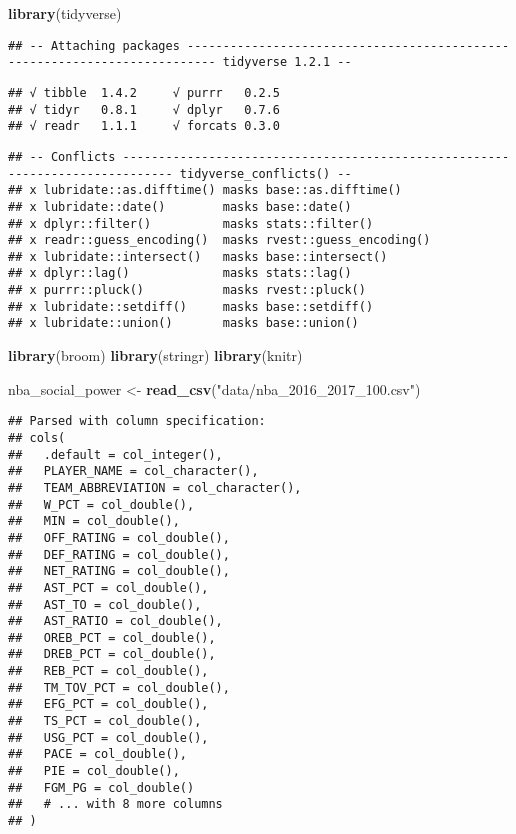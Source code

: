 \documentclass[]{article}
\title{}
\subtitle{Project Proposal}
\author{Pipe It Up!: Nagaprasad Rudrapatna, Karen Deng, Jack Muraika, Anna
Zolotor}
\date{2020-03-01}
\newenvironment{Shaded}{\begin{snugshade}}{\end{snugshade}}
\newcommand{\KeywordTok}[1]{\textcolor[rgb]{0.13,0.29,0.53}{\textbf{#1}}}
\newcommand{\NormalTok}[1]{#1}
\newcommand{\StringTok}[1]{\textcolor[rgb]{0.31,0.60,0.02}{#1}}
\begin{document}
\begin{Shaded}
\begin{Highlighting}[]
\KeywordTok{library}\NormalTok{(tidyverse)}
\end{Highlighting}
\end{Shaded}

\begin{verbatim}
## -- Attaching packages -------------------------------------------------------------------------- tidyverse 1.2.1 --
\end{verbatim}

\begin{verbatim}
## √ tibble  1.4.2     √ purrr   0.2.5
## √ tidyr   0.8.1     √ dplyr   0.7.6
## √ readr   1.1.1     √ forcats 0.3.0
\end{verbatim}

\begin{verbatim}
## -- Conflicts ----------------------------------------------------------------------------- tidyverse_conflicts() --
## x lubridate::as.difftime() masks base::as.difftime()
## x lubridate::date()        masks base::date()
## x dplyr::filter()          masks stats::filter()
## x readr::guess_encoding()  masks rvest::guess_encoding()
## x lubridate::intersect()   masks base::intersect()
## x dplyr::lag()             masks stats::lag()
## x purrr::pluck()           masks rvest::pluck()
## x lubridate::setdiff()     masks base::setdiff()
## x lubridate::union()       masks base::union()
\end{verbatim}

\begin{Shaded}
\begin{Highlighting}[]
\KeywordTok{library}\NormalTok{(broom)}
\KeywordTok{library}\NormalTok{(stringr)}
\KeywordTok{library}\NormalTok{(knitr)}
\end{Highlighting}
\end{Shaded}

\begin{Shaded}
\begin{Highlighting}[]
\NormalTok{nba_social_power <-}\StringTok{ }\KeywordTok{read_csv}\NormalTok{(}\StringTok{"data/nba_2016_2017_100.csv"}\NormalTok{)}
\end{Highlighting}
\end{Shaded}

\begin{verbatim}
## Parsed with column specification:
## cols(
##   .default = col_integer(),
##   PLAYER_NAME = col_character(),
##   TEAM_ABBREVIATION = col_character(),
##   W_PCT = col_double(),
##   MIN = col_double(),
##   OFF_RATING = col_double(),
##   DEF_RATING = col_double(),
##   NET_RATING = col_double(),
##   AST_PCT = col_double(),
##   AST_TO = col_double(),
##   AST_RATIO = col_double(),
##   OREB_PCT = col_double(),
##   DREB_PCT = col_double(),
##   REB_PCT = col_double(),
##   TM_TOV_PCT = col_double(),
##   EFG_PCT = col_double(),
##   TS_PCT = col_double(),
##   USG_PCT = col_double(),
##   PACE = col_double(),
##   PIE = col_double(),
##   FGM_PG = col_double()
##   # ... with 8 more columns
## )
\end{verbatim}
\end{document}
